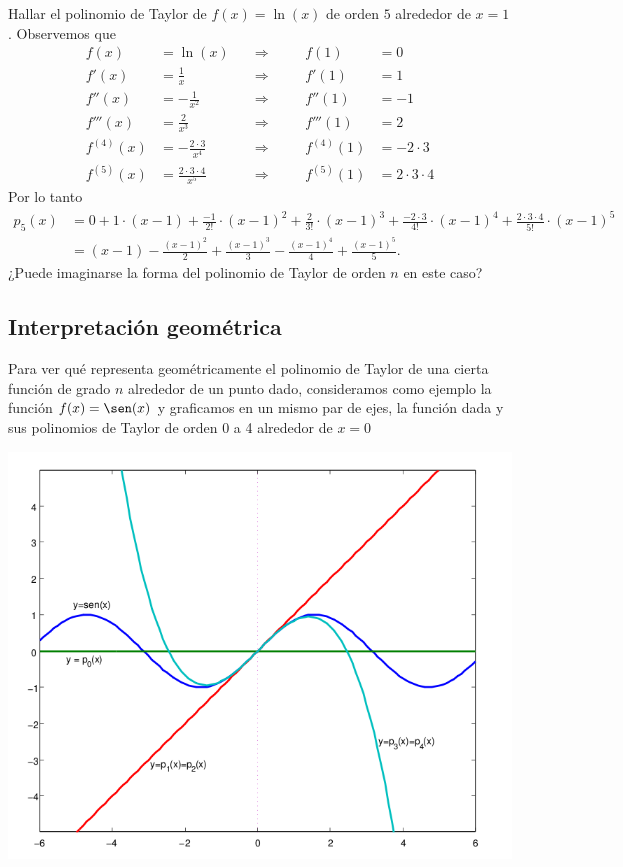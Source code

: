 \begin{example}
 Hallar el polinomio de Taylor de $f(x) = \ln (x)$ de orden $5$ alrededor de $x=1$. 
Observemos que
\[
\begin{aligned}
 f(x) &= \ln(x)  \quad &\Longrightarrow & &\quad f(1)  &= 0 \\
 f'(x) &= \frac{1}{x} \quad &\Longrightarrow& & \quad f'(1) &= 1 \\
 f''(x) &= -\frac{1}{x^2}\quad &\Longrightarrow& & \quad f''(1) &= -1 \\
 f'''(x) &= \frac{2}{x^3} \quad &\Longrightarrow& & \quad f'''(1) &= 2 \\
 f^{(4)}(x) &= -\frac{2\cdot 3}{x^4} \quad &\Longrightarrow& & \quad f^{(4)}(1) &= -2 \cdot 3 \\
 f^{(5)}(x) &= \frac{2\cdot 3 \cdot 4}{x^5} \quad &\Longrightarrow& & \quad f^{(5)}(1) &= 2 \cdot 3\cdot 4 
\end{aligned}
\]
Por lo tanto
\begin{align*}
p_5(x) &= 0 + 1 \cdot (x-1) + \frac{-1}{2!} \cdot (x-1)^2 + \frac{2}{3!} \cdot (x-1)^3 +
          \frac{-2 \cdot 3}{4!} \cdot (x-1)^4 + \frac{2\cdot 3\cdot 4}{5!} \cdot (x-1)^5\\
       &= (x-1) - \frac{(x-1)^2}{2} + \frac{(x-1)^3}{3} - \frac{(x-1)^4}{4} + \frac{(x-1)^5}{5}.
\end{align*}
¿Puede imaginarse la forma del polinomio de Taylor de orden $n$ en este caso?
\end{example}

\subsection*{Interpretación geométrica}

Para ver qué representa geométricamente el polinomio de Taylor de una cierta función de grado $n$ alrededor de un punto dado, consideramos como ejemplo la función $f(x) = \sen(x)$ y graficamos en un mismo par de ejes, la función dada y sus polinomios de Taylor de orden 0 a 4 alrededor de $x=0$

\centerline{\includegraphics[width=.6\textwidth]{pics/taylor-seno-1.png}}

